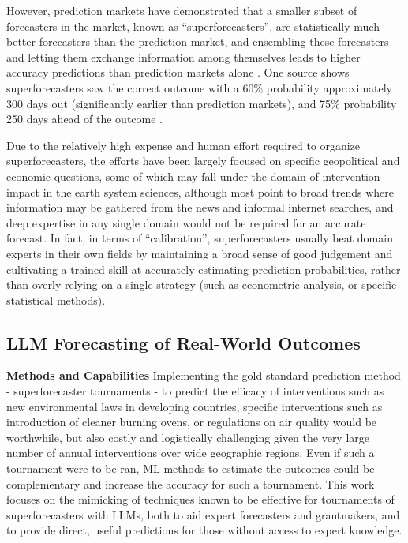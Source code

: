 \documentclass[12pt,a4paper]{article}
\begin{document}
However, prediction markets have demonstrated that a smaller subset of forecasters in the market, known as ``superforecasters'', are statistically much better forecasters than the prediction market, and ensembling these forecasters and letting them exchange information among themselves leads to higher accuracy predictions than prediction markets alone . One source shows superforecasters saw the correct outcome with a 60\% probability approximately 300 days out (significantly earlier than prediction markets), and 75\% probability 250 days ahead of the outcome .

Due to the relatively high expense and human effort required to organize superforecasters, the efforts have been largely focused on specific geopolitical and economic questions, some of which may fall under the domain of intervention impact in the earth system sciences, although most point to broad trends where information may be gathered from the news and informal internet searches, and deep expertise in any single domain would not be required for an accurate forecast. In fact, in terms of ``calibration'', superforecasters usually beat domain experts in their own fields by maintaining a broad sense of good judgement and cultivating a trained skill at accurately estimating prediction probabilities, rather than overly relying on a single strategy (such as econometric analysis, or specific statistical methods).

\subsection{LLM Forecasting of Real-World Outcomes}

\textbf{Methods and Capabilities}
Implementing the gold standard prediction method - superforecaster tournaments - to predict the efficacy of interventions such as new environmental laws in developing countries, specific interventions such as introduction of cleaner burning ovens, or regulations on air quality would be worthwhile, but also costly and logistically challenging given the very large number of annual interventions over wide geographic regions. Even if such a tournament were to be ran, ML methods to estimate the outcomes could be complementary and increase the accuracy for such a tournament. This work focuses on the mimicking of techniques known to be effective for tournaments of superforecasters with LLMs, both to aid expert forecasters and grantmakers, and to provide direct, useful predictions for those without access to expert knowledge.
\end{document}
